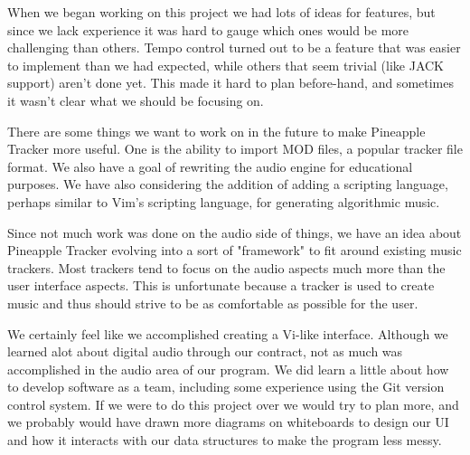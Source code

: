 \documentclass[12pt,letterpaper]{article}
\begin{document}
\par
When we began working on this project we had lots of ideas for features, but since we lack experience it was hard to gauge which ones would be more challenging than others. Tempo control turned out to be a feature that was easier to implement than we had expected, while others that seem trivial (like JACK support) aren't done yet. This made it hard to plan before-hand, and sometimes it wasn't clear what we should be focusing on.

\par
There are some things we want to work on in the future to make Pineapple Tracker more useful. One is the ability to import MOD files, a popular tracker file format. We also have a goal of rewriting the audio engine for educational purposes. We have also considering the addition of adding a scripting language, perhaps similar to Vim's scripting language, for generating algorithmic music.

\par
Since not much work was done on the audio side of things, we have an idea about Pineapple Tracker evolving into a sort of "framework" to fit around existing music trackers. Most trackers tend to focus on the audio aspects much more than the user interface aspects. This is unfortunate because a tracker is used to create music and thus should strive to be as comfortable as possible for the user.

\par
We certainly feel like we accomplished creating a Vi-like interface. Although we learned alot about digital audio through our contract, not as much was accomplished in the audio area of our program. We did learn a little about how to develop software as a team, including some experience using the Git version control system. If we were to do this project over we would try to plan more, and we probably would have drawn more diagrams on whiteboards to design our UI and how it interacts with our data structures to make the program less messy.
\end{document}

